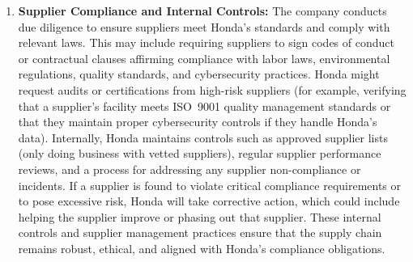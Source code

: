 \begin{enumerate}
    \item \textbf{Supplier Compliance and Internal Controls:} The company conducts due diligence to ensure suppliers meet Honda’s standards and comply with relevant laws. This may include requiring suppliers to sign codes of conduct or contractual clauses affirming compliance with labor laws, environmental regulations, quality standards, and cybersecurity practices. Honda might request audits or certifications from high-risk suppliers (for example, verifying that a supplier’s facility meets ISO~9001 quality management standards or that they maintain proper cybersecurity controls if they handle Honda’s data). Internally, Honda maintains controls such as approved supplier lists (only doing business with vetted suppliers), regular supplier performance reviews, and a process for addressing any supplier non-compliance or incidents. If a supplier is found to violate critical compliance requirements or to pose excessive risk, Honda will take corrective action, which could include helping the supplier improve or phasing out that supplier. These internal controls and supplier management practices ensure that the supply chain remains robust, ethical, and aligned with Honda’s compliance obligations.
\end{enumerate}

